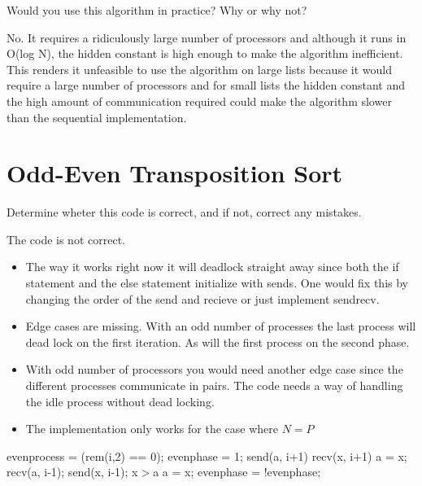 \documentclass[a4paper]{exam}
\begin{document}
\begin{questions}
\begin{solution}
\end{solution}

\addpoints \question Would you use this algorithm in practice? Why or why not?

\begin{solution}
  No. It requires a ridiculously large number of processors and although it runs in O(log N), the hidden constant is high enough to make the algorithm inefficient. This renders it unfeasible to use the algorithm on large lists because it would require a large number of processors and for small lists the hidden constant and the high amount of communication required could make the algorithm slower than the sequential implementation.
\end{solution}

\section{Odd-Even Transposition Sort}

\addpoints \question Determine wheter this code is correct, and if not, correct any mistakes.



\begin{solution}

  The code is not correct.

\begin{itemize}
  \item The way it works right now it will deadlock straight away since both the if statement and the else statement initialize with sends. One would fix this by changing the order of the send and recieve or just implement sendrecv.
  \item Edge cases are missing. With an odd number of processes the last process will dead lock on the first iteration. As will the first process on the second phase.
  \item With odd number of processors you would need another edge case since the different processes communicate in pairs. The code needs a way of handling the idle process without dead locking.
  \item The implementation only works for the case where $N=P$
\end{itemize}

\end{solution}

\begin{algorithm}
  \begin{algorithmic}[1]
    \State evenprocess = (rem(i,2) == 0);
    \State evenphase = 1;
      \State send(a, i+1)
      \State recv(x, i+1)
          \State a = x;
        \EndIf
      \Else
        \State recv(a, i-1);
        \State send(x, i-1);
        \If x$>$a
          a = x;
        \EndIf
      \EndIf
      \State evenphase = !evenphase;
    \EndFor
  \end{algorithmic}
\end{algorithm}

\end{questions}
\end{document}

